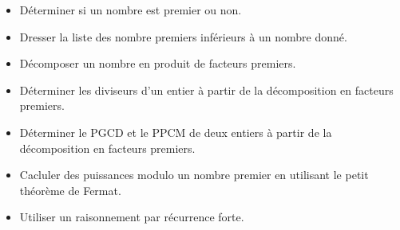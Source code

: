 \documentclass[12pt]{article}
\theoremstyle{break}
\begin{document}
\vspace{1em}

\begin{savoir}{}{}
\begin{itemize}[noitemsep,topsep=0pt]
  \item Déterminer si un nombre est premier ou non.
  \item Dresser la liste des nombre premiers inférieurs à un nombre donné.
  \item Décomposer un nombre en produit de facteurs premiers.
  \item Déterminer les diviseurs d'un entier à partir de la décomposition en facteurs premiers.
  \item Déterminer le PGCD et le PPCM de deux entiers à partir de la décomposition en facteurs premiers.
  \item Cacluler des puissances modulo un nombre premier en utilisant le petit théorème de Fermat.
  \item Utiliser un raisonnement par récurrence forte.
\end{itemize}
\end{savoir}
\end{document}
